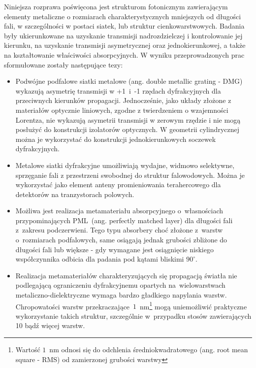 Niniejsza rozprawa poświęcona jest strukturom fotonicznym zawierającym elementy metaliczne o rozmiarach charakterystycznych mniejszych od długości fali, w szczególności w postaci siatek, lub struktur cienkowarstwowych. Badania były ukierunkowane na uzyskanie  transmisji nadrozdzielczej i kontrolowanie jej kierunku, na uzyskanie transmisji asymetrycznej oraz jednokierunkowej, a także na kształtowanie właściwości absorpcyjnych. W wyniku przeprowadzonych prac sformułowane zostały następujące tezy:

\begin{itemize}
\item Podwójne podfalowe siatki metalowe (ang. double metallic grating - DMG) wykazują asymetrię transmisji w +1~i~-1 rzędach dyfrakcyjnych dla przeciwnych kierunków propagacji. Jednocześnie, jako układy złożone z materiałów optycznie liniowych, zgodne z twierdzeniem o wzajemności Lorentza, nie wykazują asymetrii transmisji w zerowym rzędzie i nie mogą posłużyć do konstrukcji izolatorów optycznych. W geometrii cylindrycznej można je wykorzystać do konstrukcji jednokierunkowych soczewek dyfrakcyjnych.

\item Metalowe siatki dyfrakcyjne umożliwiają wydajne, widmowo selektywne, sprzęganie fali z przestrzeni swobodnej do struktur falowodowych. Można je wykorzystać jako element anteny promieniowania terahercowego dla detektorów na tranzystorach polowych.

\item Możliwa jest realizacja metamateriału absorpcyjnego o~własnościach przypominających PML~(ang. perfectly matched layer) dla długości fali z~zakresu podczerwieni. Tego typu absorbery choć złożone z~warstw o~rozmiarach podfalowych, same osiągają jednak grubości zbliżone do długości fali lub większe - gdy wymagane jest osiągnięcie niskiego współczynnika odbicia dla padania pod kątami bliskimi $90^{\circ}$.

\item Realizacja metamateriałów charakteryzujących się propagacją światła nie podlegającą ograniczeniu dyfrakcyjnemu opartych na~wielowarstwach metaliczno-dielektryczne wymaga bardzo gładkiego napylania warstw. Chropowatości warstw przekraczające~$1$~nm\footnote{Wartość $1$~nm odnosi się do odchlenia średniokwadratowego (ang. root mean square - RMS) od zamierzonej grubości warstwy} mogą uniemożliwić praktyczne wykorzystanie takich struktur, szczególnie w~przypadku stosów zawierających 10 bądź więcej warstw.
\end{itemize}
